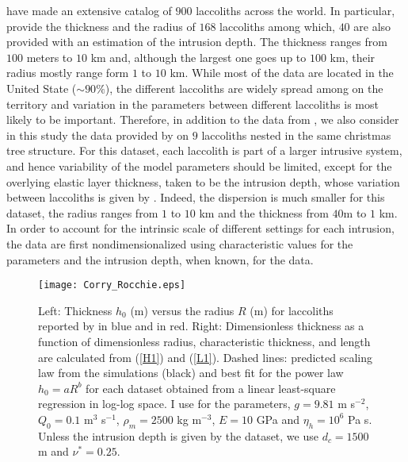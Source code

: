 \citet{E:2015tl} have  made an  extensive catalog of  $900$ laccoliths
across  the  world.   In   particular,  \citet{E:2015tl}  provide  the
thickness and  the radius  of $168$ laccoliths  among which,  $40$ are
also  provided  with  an  estimation  of  the  intrusion  depth.   The
thickness  ranges from  $100$  meters  to $10$  km  and, although  the
largest one goes up to $100$ km, their radius mostly range form $1$ to
$10$  km.  While  most of  the data  are located  in the  United State
($\sim 90\%$), the different laccoliths are widely spread among on the
territory and variation in the parameters between different laccoliths
is most  likely to be  important. Therefore,  in addition to  the data
from  \citet{E:2015tl},  we  also  consider in  this  study  the  data
provided by \citet{Rocchi:2002jy} on $9$ laccoliths nested in the same
christmas tree structure. For this  dataset, each laccolith is part of
a  larger  intrusive  system,  and  hence  variability  of  the  model
parameters should be  limited, except for the  overlying elastic layer
thickness, taken  to be the  intrusion depth, whose  variation between
laccoliths is  given by \citet{Rocchi:2002jy}. Indeed,  the dispersion
is much smaller  for this dataset, the radius ranges  from $1$ to $10$
km and the thickness from $40$m to $1$ km. In order to account for the
intrinsic scale of different settings for each intrusion, the data are
first   nondimensionalized  using   characteristic   values  for   the
parameters and the intrusion depth, when known, for the data.

\begin{figure}
  \begin{center}
    \graphicspath{ {/Users/thorey/Documents/These/Projet/Refroidissement/Skin_Model/Figure/Figure_Data/} }
    \texttt{[image: Corry\_Rocchie.eps]}
    \caption{Left: Thickness $h_0$  (m) versus the radius  $R$ (m) for
      laccoliths   reported   by    \citet{E:2015tl}   in   blue   and
      \citet{Rocchi:2002jy} in red.  Right: Dimensionless thickness as
      a  function of  dimensionless radius,  characteristic thickness,
      and  length  are  calculated  from  (\ref{H1})  and  (\ref{L1}).
      Dashed lines: predicted scaling law from the simulations (black)
      and  best fit  for the  power  law $h_0=aR^b$  for each  dataset
      obtained from a linear least-square regression in log-log space.
      I  use  for the  parameters,  $g=9.81$  m s$^{-2}$,  $Q_0=  0.1$
      m$^{3}$  s$^{-1}$, $\rho_m=2500$  kg  m$^{-3}$,  $E=10$ GPa  and
      $\eta_h=10^6$ Pa s.  Unless the intrusion depth is  given by the
      dataset, we use $d_c=1500$ m and $\nu^*=0.25$.}
    \label{Corry_Rocchie}
  \end{center}
\end{figure}



